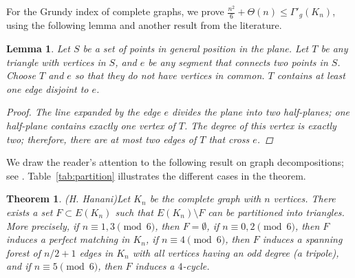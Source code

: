 \documentclass[11pt]{article}
\newtheorem{theorem}{Theorem}
\newtheorem{lemma}{Lemma}
\begin{document}
For the Grundy index of complete graphs, we prove $\frac{n^2}{6}+\Theta(n)\leq \Gamma'_g(K_n)$, using
the following lemma and another result from the literature. 

\begin{lemma}\label{lem:triangle-edge}
Let $S$ be a set of points in general position in the plane. Let $T$ be any triangle with vertices in $S$, and $e$ be any segment that connects two points in $S$. Choose $T$ and $e$ so that they do not have vertices in common. $T$ contains at least one edge disjoint to $e$.
\begin{proof}
    The line expanded by the edge $e$ divides the plane into two half-planes; one half-plane contains exactly one vertex of $T$. The degree of this vertex is exactly two; therefore, there are at most two edges of $T$ that cross $e$.
\end{proof}
\end{lemma}

We draw the reader's attention to the following result on graph decompositions; see \cite{MR2071903,MR382030}. Table~\ref{tab:partition} illustrates the different cases in the theorem.


\begin{theorem}(H. Hanani)\label{thm:partition}
    Let $K_n$ be the complete graph with $n$ vertices. There exists a set $F \subset E(K_n)$ such that $E(K_n) \setminus F$ can be partitioned into triangles. More precisely, if $n\equiv 1, 3 \pmod 6$, then $F = \emptyset$, if $n\equiv 0, 2 \pmod 6$, then $F$ induces a perfect matching in $K_n$, if $n\equiv 4 \pmod 6$, then $F$ induces a spanning forest of $n/2 + 1$ edges in $K_n$ with all vertices having an odd degree (a tripole), and if $n\equiv 5 \pmod 6$, then $F$ induces a $4$-cycle. 
\end{theorem}
\end{document}
